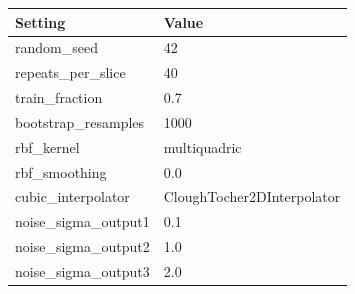 \begin{tabular}{ll}
\toprule
Setting & Value \\
\midrule
random_seed & 42 \\
repeats_per_slice & 40 \\
train_fraction & 0.7 \\
bootstrap_resamples & 1000 \\
rbf_kernel & multiquadric \\
rbf_smoothing & 0.0 \\
cubic_interpolator & CloughTocher2DInterpolator \\
noise_sigma_output1 & 0.1 \\
noise_sigma_output2 & 1.0 \\
noise_sigma_output3 & 2.0 \\
\bottomrule
\end{tabular}
